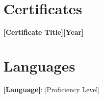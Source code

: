 \documentclass[letterpaper,10pt]{article}
\newcommand{\heading}[2]{
  \hspace{10pt}#1\hfill#2\\
}
\newcommand{\headingBf}[2]{
  \heading{\textbf{#1}}{\textbf{#2}}
}
\begin{document}
\section{Certificates}
 \headingBf{[Certificate Title]}{[Year]}

\section{Languages}
\textbf{[Language]}: [Proficiency Level]
\end{document}
